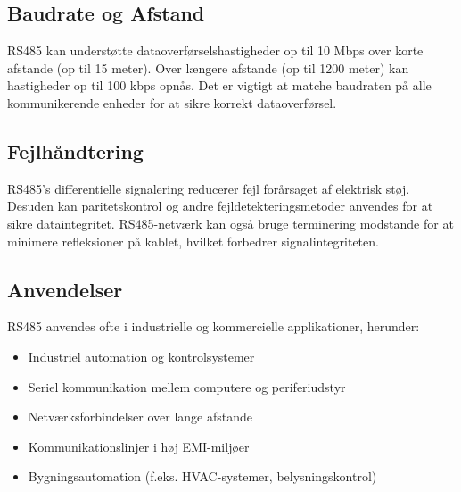 \subsection{Baudrate og Afstand}
RS485 kan understøtte dataoverførselshastigheder op til 10 Mbps over korte afstande (op til 15 meter). Over længere afstande (op til 1200 meter) kan hastigheder op til 100 kbps opnås. Det er vigtigt at matche baudraten på alle kommunikerende enheder for at sikre korrekt dataoverførsel.

\subsection{Fejlhåndtering}
RS485's differentielle signalering reducerer fejl forårsaget af elektrisk støj. Desuden kan paritetskontrol og andre fejldetekteringsmetoder anvendes for at sikre dataintegritet. RS485-netværk kan også bruge terminering modstande for at minimere refleksioner på kablet, hvilket forbedrer signalintegriteten.

\subsection{Anvendelser}
RS485 anvendes ofte i industrielle og kommercielle applikationer, herunder:
\begin{itemize}
	\item Industriel automation og kontrolsystemer
	\item Seriel kommunikation mellem computere og periferiudstyr
	\item Netværksforbindelser over lange afstande
	\item Kommunikationslinjer i høj EMI-miljøer
	\item Bygningsautomation (f.eks. HVAC-systemer, belysningskontrol)
\end{itemize}

